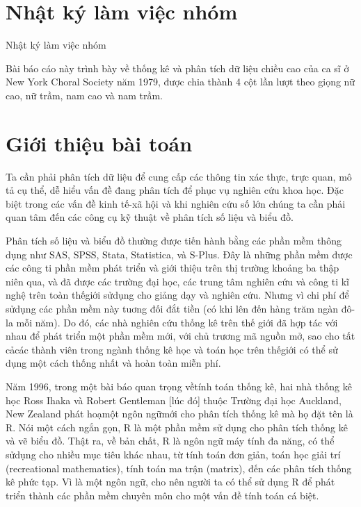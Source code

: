 \documentclass[a4paper]{article}
\begin{document}

\newpage
\tableofcontents
\newpage
\section*{Nhật ký làm việc nhóm}
Nhật ký làm việc nhóm
\newpage

Bài báo cáo này trình bày về thống kê và phân tích dữ liệu chiều cao của ca sĩ ở New York Choral Society năm 1979, được chia thành 4 cột lần lượt theo giọng nữ cao, nữ trầm, nam cao và nam trầm.

\section{Giới thiệu bài toán}
Ta cần phải phân tích dữ liệu để cung cấp các thông tin xác thực, trực quan, mô tả cụ thể, dễ hiểu vấn đề đang phân tích để phục vụ nghiên cứu khoa học.  Đặc biệt trong các vấn đề kinh tế-xã hội và khi nghiên cứu số lớn chúng ta cần phải quan tâm đến các công cụ kỹ thuật về phân tích số liệu và biểu đồ.

Phân tích số liệu và biểu đồ thường được tiến hành bằng các phần mềm thông dụng như SAS, SPSS, Stata, Statistica, và S-Plus.  Đây là những phần mềm được các công ti phần mềm phát triển và giới thiệu trên thị trường khoảng ba thập niên qua, và đã được các trường đại học, các trung tâm nghiên cứu và công ti kĩ nghệ trên toàn thếgiới sửdụng cho giảng dạy và nghiên cứu. Nhưng vì chi phí để sửdụng các phần mềm này tuơng đối đắt tiền (có khi lên đến hàng trăm ngàn đô-la mỗi năm). Do đó, các nhà nghiên cứu thống kê trên thế giới đã hợp tác với nhau để phát triển một phần mềm mới, với chủ trương mã nguồn mở, sao cho tất cảcác thành viên trong ngành thống kê học và toán học trên thếgiới có thể sử dụng một cách thống nhất và hoàn toàn miễn phí. 

Năm 1996, trong một bài báo quan trọng vềtính toán thống kê, hai nhà thống kê học Ross Ihaka và Robert Gentleman [lúc đó] thuộc Trường đại học Auckland, New Zealand phát hoạmột ngôn ngữmới cho phân tích thống kê mà họ đặt tên là R. Nói một cách ngắn gọn, R là một phần mềm sử dụng cho phân tích thống kê và vẽ biểu đồ. Thật ra, về bản chất, R là ngôn ngữ máy tính đa năng, có thể sửdụng cho nhiều mục tiêu khác nhau, từ tính toán đơn giản, toán học giải trí (recreational mathematics), tính toán ma trận (matrix), đến các phân tích thống kê phức tạp. Vì là một ngôn ngữ, cho nên người ta có thể sử dụng R để phát triển thành các phần mềm chuyên môn cho một vấn đề tính toán cá biệt. 
\end{document}
